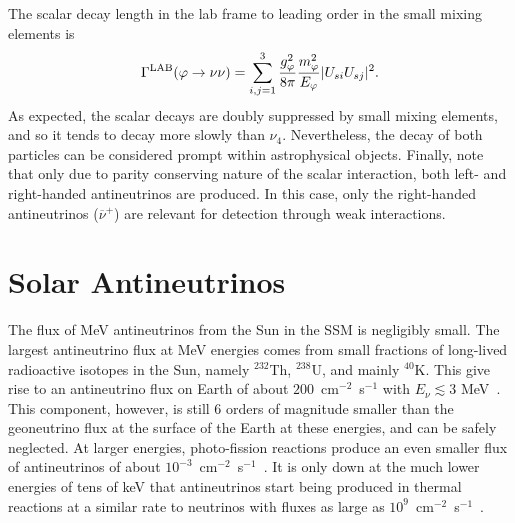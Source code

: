 \documentclass[
reprint,
superscriptaddress,
showpacs,
preprintnumbers,
nofootinbib,
nobibnotes,
amsmath,
amssymb, 
aps,
prd,
floatfix
]{revtex4-1}
\renewcommand{\phi}{\varphi}
\begin{document}
The scalar decay length in the lab frame to leading order in the small mixing elements is
\begin{equation}
    \Gamma^{\rm LAB} (\phi \to \nu \nu) = \sum_{i,j=1}^3\frac{g_\phi^2}{8\pi} \frac{m_\phi^2}{E_\phi} |U_{s i}U_{s j}|^2.
\end{equation}
As expected, the scalar decays are doubly suppressed by small mixing elements, and so it tends to decay more slowly than $\nu_4$. Nevertheless, the decay of both particles can be considered prompt within astrophysical objects. Finally, note that only due to parity conserving nature of the scalar interaction, both left- and right-handed antineutrinos are produced. In this case, only the right-handed antineutrinos ($\overline{\nu}^+$) are relevant for detection through weak interactions.

\section{Solar Antineutrinos}\label{sec:solantinus}

The flux of MeV antineutrinos from the Sun in the SSM is negligibly small. The largest antineutrino flux at MeV energies comes from small fractions of long-lived radioactive isotopes in the Sun, namely $^{232}$Th, $^{238}$U, and mainly $^{40}$K. This give rise to an antineutrino flux on Earth of about $200$~cm$^{-2}$~s$^{-1}$ with $E_\nu \lesssim 3$ MeV~\cite{Malaney:1989hs}. This component, however, is still 6 orders of magnitude smaller than the geoneutrino flux at the surface of the Earth at these energies, and can be safely neglected. At larger energies, photo-fission reactions produce an even smaller flux of antineutrinos of about $10^{-3}$~cm$^{-2}$~s$^{-1}$~\cite{Malaney:1989hs}. It is only down at the much lower energies of tens of keV that antineutrinos start being produced in thermal reactions at a similar rate to neutrinos with fluxes as large as $10^9$~cm$^{-2}$~s$^{-1}$~\cite{Vitagliano:2017odj}.
\end{document}
